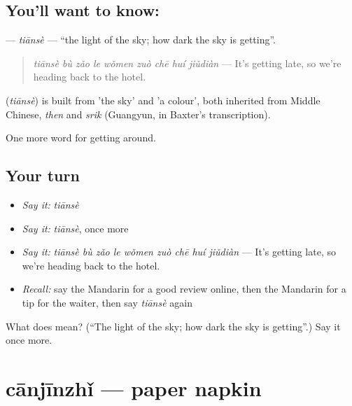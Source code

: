 \subsection*{You'll want to know: }
\textbf{} — \emph{tiānsè} — \textquotedblleft{}the light of the sky; how dark the sky is getting\textquotedblright{}.

\begin{quote}
\textbf{} \emph{tiānsè bù zǎo le wǒmen zuò chē huí jiǔdiàn} — It's getting late, so we're heading back to the hotel.
\end{quote}

\begin{cousinweb}
\textbf{} (\emph{tiānsè}) is built from  'the sky' and  'a colour', both inherited from Middle Chinese, \emph{then} and \emph{srik} (Guangyun, in Baxter's transcription).
\end{cousinweb}

\begin{grammarlens}[title={What you've built}]
One more word for getting around.
\end{grammarlens}

\subsection*{Your turn}
\begin{itemize}
\raggedright
  \item \emph{Say it:} \emph{tiānsè}
  \item \emph{Say it:} \emph{tiānsè}, once more
  \item \emph{Say it:} \emph{tiānsè bù zǎo le wǒmen zuò chē huí jiǔdiàn} — It's getting late, so we're heading back to the hotel.
  \item \emph{Recall:} say the Mandarin for a good review online, then the Mandarin for a tip for the waiter, then say \emph{tiānsè} again
\end{itemize}

\begin{tcolorbox}[breakable,colback=teal!4,colframe=teal!35!black,title={Before you move on}]
What does  mean? (\textquotedblleft{}The light of the sky; how dark the sky is getting\textquotedblright{}.) Say it once more.
\end{tcolorbox}
\section[cānjīnzhǐ]{cānjīnzhǐ — paper napkin}

